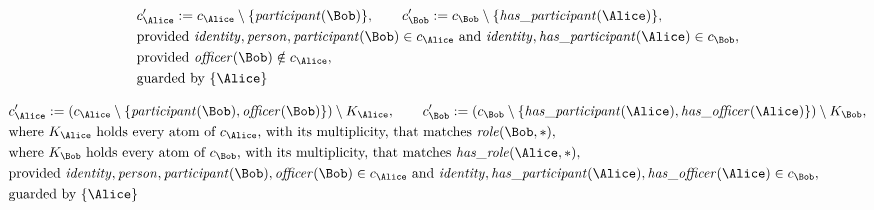 \begin{align*}
&
c'_
{
\Alice
}
 := 
c_
{
\Alice
}
 \setminus 
\{
\mathit{\detokenize{
participant
}}
(
\Bob
)
\}
, \qquad 
c'_
{
\Bob
}
 := 
c_
{
\Bob
}
 \setminus 
\{
\mathit{\detokenize{
has_participant
}}
(
\Alice
)
\}
,\\
&
\text{provided } 
\mathit{\detokenize{
identity
}}
,
\mathit{\detokenize{
person
}}
,
\mathit{\detokenize{
participant
}}
(
\Bob
)
 \in c_
{
\Alice
}
 \text{ and } 
\mathit{\detokenize{
identity
}}
,
\mathit{\detokenize{
has_participant
}}
(
\Alice
)
 \in c_
{
\Bob
}
,\\
&
\text{provided } 
\mathit{\detokenize{
officer
}}
(
\Bob
)
 \notin c_
{
\Alice
}
,\\
&
\text{guarded by } \{
\Alice
\}
\end{align*}

\begin{align*}
&
c'_
{
\Alice
}
 := 
(c_
{
\Alice
}
 \setminus 
\{
\mathit{\detokenize{
participant
}}
(
\Bob
)
,
\mathit{\detokenize{
officer
}}
(
\Bob
)
\}
) \setminus K_
{
\Alice
}
, \qquad 
c'_
{
\Bob
}
 := 
(c_
{
\Bob
}
 \setminus 
\{
\mathit{\detokenize{
has_participant
}}
(
\Alice
)
,
\mathit{\detokenize{
has_officer
}}
(
\Alice
)
\}
) \setminus K_
{
\Bob
}
,\\
&
\text{where } K_
{
\Alice
}
 \text{ holds every atom of } c_
{
\Alice
}
 \text{, with its multiplicity, that matches } 
\mathit{\detokenize{
role
}}
(
\Bob
,
\ast
)
,\\
&
\text{where } K_
{
\Bob
}
 \text{ holds every atom of } c_
{
\Bob
}
 \text{, with its multiplicity, that matches } 
\mathit{\detokenize{
has_role
}}
(
\Alice
,
\ast
)
,\\
&
\text{provided } 
\mathit{\detokenize{
identity
}}
,
\mathit{\detokenize{
person
}}
,
\mathit{\detokenize{
participant
}}
(
\Bob
)
,
\mathit{\detokenize{
officer
}}
(
\Bob
)
 \in c_
{
\Alice
}
 \text{ and } 
\mathit{\detokenize{
identity
}}
,
\mathit{\detokenize{
has_participant
}}
(
\Alice
)
,
\mathit{\detokenize{
has_officer
}}
(
\Alice
)
 \in c_
{
\Bob
}
,\\
&
\text{guarded by } \{
\Alice
\}
\end{align*}


